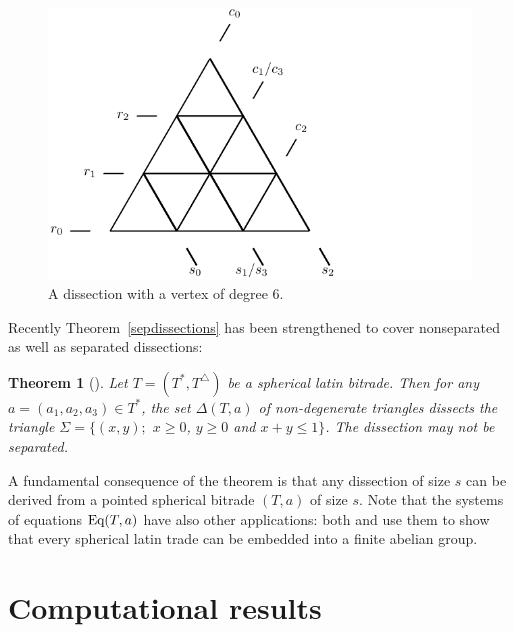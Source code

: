\documentclass[12pt,amstags,fleqn]{article}
\theoremstyle{plain}
\newtheorem{theorem}{Theorem}[section]
\theoremstyle{definition}
\def\ll{{\textstyle \ast}}
\def\rr{{\scriptscriptstyle \triangle}}
\newcommand{\eq}{\textnormal{Eq}}
\begin{document}
\begin{figure}[hbt]
\begin{center}
\includegraphics{sixway.pdf}
\end{center}
\caption{A dissection with a vertex of degree $6$.}
\label{figsixway}
\end{figure}

Recently Theorem~\ref{sepdissections} has been strengthened to cover
nonseparated as well as separated dissections:

\begin{theorem}[\cite{alesnew}]\label{strongertheorem}
Let $T=(T^\ll, T^\rr)$ be a spherical latin bitrade. Then for 
any $a=(a_1,a_2,a_3) \in T^\ll$, the set $\Delta(T,a)$ of non-degenerate triangles
dissects the triangle
$\Sigma = \{(x,y);$ $x\ge 0$, $y\ge 0$ and $x+y \le 1\}$. The
dissection may not be separated.
\end{theorem}

A fundamental consequence of the theorem is that any dissection of size $s$
can be derived from a pointed spherical bitrade $(T, a)$ of size $s$.
Note that the systems of equations $\eq(T, a)$ have also other
applications: both \cite{nickWanlessBlah} and \cite{alesdissections}
use them to show that every spherical latin trade can be embedded
into a finite abelian group.

\section{Computational results}
\end{document}
